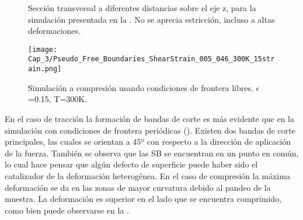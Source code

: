 \begin{figure}[htp]
\centering
{}
\caption[Sección transversal a diferentes distancias sobre el eje z usando condiciones de frontera libres]{Sección transversal a diferentes distancias sobre el eje z, para la simulación presentada en la . No se aprecia estricción, incluso a altas deformaciones.}
\label{C3:fg:cross}
\end{figure}

\begin{figure}[htp]
\centering
\texttt{[image: Cap\_3/Pseudo\_Free\_Boundaries\_ShearStrain\_005\_046\_300K\_15strain.png]}
\caption[Simulación a compresión usando condiciones de frontera libres]{Simulación a compresión usando condiciones de frontera libres. $\epsilon$=0.15, T=300K.}
\label{C3:fg:libresComp}
\end{figure}

En el caso de tracción la formación de bandas de corte es más evidente que en la simulación con condiciones de frontera periódicas (). Existen dos bandas de corte principales, las cuales se orientan a $45º$ con respecto a la dirección de aplicación de la fuerza. También se observa que las SB se encuentran en un punto en común, lo cual hace pensar que algún defecto de superficie puede haber sido el catalizador de la deformación heterogénea. En el caso de compresión la máxima deformación se da en las zonas de mayor curvatura debido al pandeo de la muestra. La deformación es superior en el lado que se encuentra comprimido, como bien puede observarse en la .






